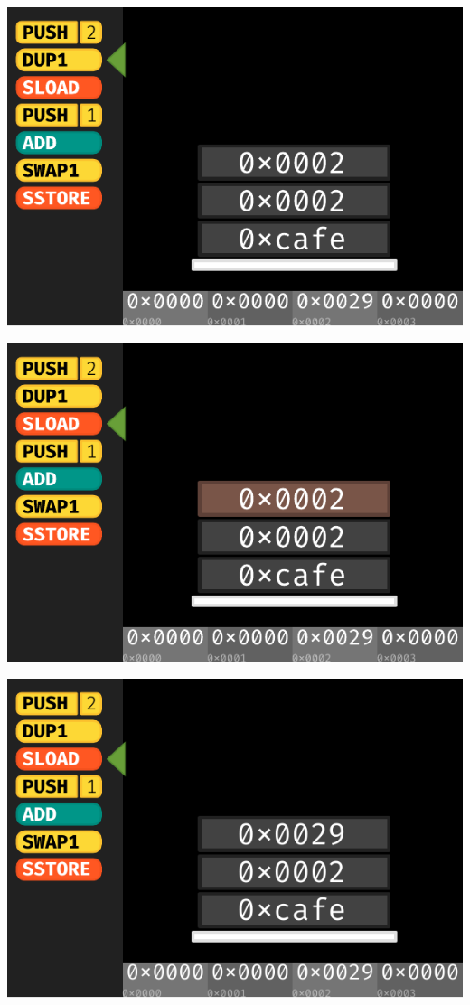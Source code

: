 \documentclass[xcolor=x11names,compress]{beamer}
\begin{document}
\begin{frame}
\begin{overprint}
\begin{center}
		\end{center}
		\begin{center}
			\includegraphics[width=\textwidth,height=0.8\textheight,keepaspectratio]{img/stackmachine/06.pdf}
		\end{center}
		\begin{center}
			\includegraphics[width=\textwidth,height=0.8\textheight,keepaspectratio]{img/stackmachine/07.pdf}
		\end{center}
		\begin{center}
			\includegraphics[width=\textwidth,height=0.8\textheight,keepaspectratio]{img/stackmachine/08.pdf}

\end{center}
\end{overprint}
\end{frame}
\end{document}
